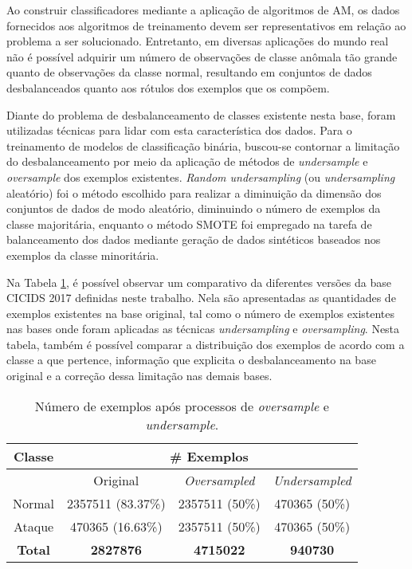 Ao construir classificadores mediante a aplicação de algoritmos de AM, os dados fornecidos aos algoritmos de treinamento devem ser representativos em relação ao problema a ser solucionado. Entretanto, em diversas aplicações do mundo real não é possível adquirir um número de observações de classe anômala tão grande quanto de observações da classe normal, resultando em conjuntos de dados desbalanceados quanto aos rótulos dos exemplos que os compõem.

Diante do problema de desbalanceamento de classes existente nesta base, foram utilizadas técnicas para lidar com esta característica dos dados. Para o treinamento de modelos de classificação binária, buscou-se contornar a limitação do desbalanceamento por meio da aplicação de métodos de \textit{undersample} e \textit{oversample} dos exemplos existentes. \textit{Random undersampling} (ou \textit{undersampling} aleatório) foi o método escolhido para realizar a diminuição da dimensão dos conjuntos de dados de modo aleatório, diminuindo o número de exemplos da classe majoritária, enquanto o método SMOTE foi empregado na tarefa de balanceamento dos dados mediante geração de dados sintéticos baseados nos exemplos da classe minoritária.

Na Tabela \ref{tab:exemplos-apos-over-e-under}, é possível observar um comparativo da diferentes versões da base CICIDS 2017 definidas neste trabalho. Nela são apresentadas as quantidades de exemplos existentes na base original, tal como o número de exemplos existentes nas bases onde foram aplicadas as técnicas \textit{undersampling} e \textit{oversampling}. Nesta tabela, também é possível comparar a distribuição dos exemplos de acordo com a classe a que pertence, informação que explicita o desbalanceamento na base original e a correção dessa limitação nas demais bases.

\begin{table}[H]
    \centering
    \begin{tabular}{cccc}
        \hline
        \textbf{Classe} & \multicolumn{3}{c}{\textbf{\# Exemplos}} \\
        \hline
        & Original & \textit{Oversampled} & \textit{Undersampled} \\
        Normal & 2357511 (83.37\%) & 2357511 (50\%) & 470365 (50\%) \\
        Ataque & 470365 (16.63\%) & 2357511 (50\%) & 470365 (50\%) \\
        \hline
        \textbf{Total} & \textbf{2827876} & \textbf{4715022} & \textbf{940730} \\
    \end{tabular} 
    \caption{Número de exemplos após processos de \textit{oversample} e \textit{undersample}.}
    \label{tab:exemplos-apos-over-e-under}
\end{table}

